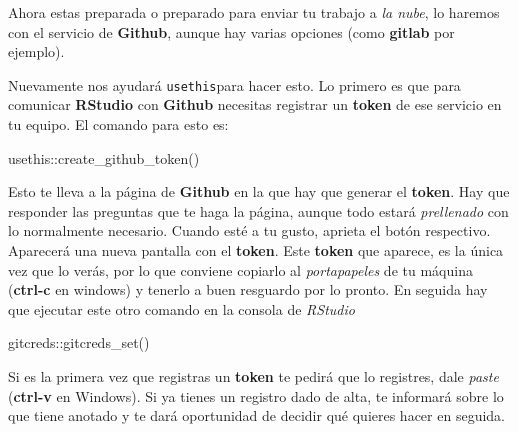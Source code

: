 \documentclass[
  spanish,
  letterpaper,
  DIV=11,
  numbers=noendperiod]{scrartcl}
\newenvironment{Shaded}{\begin{snugshade}}{\end{snugshade}}
\newcommand{\FunctionTok}[1]{\textcolor[rgb]{0.28,0.35,0.67}{#1}}
\newcommand{\NormalTok}[1]{\textcolor[rgb]{0.00,0.23,0.31}{#1}}
\newcommand{\SpecialCharTok}[1]{\textcolor[rgb]{0.37,0.37,0.37}{#1}}
\begin{document}
\begin{tcolorbox}
\end{tcolorbox}

\begin{tcolorbox}[enhanced jigsaw, rightrule=.15mm, toprule=.15mm, coltitle=black, opacitybacktitle=0.6, colframe=quarto-callout-warning-color-frame, leftrule=.75mm, title=\textcolor{quarto-callout-warning-color}{\faExclamationTriangle}\hspace{0.5em}{Enviar el \emph{repositorio} \textbf{git} a la nube}, bottomtitle=1mm, toptitle=1mm, colbacktitle=quarto-callout-warning-color!10!white, colback=white, breakable, opacityback=0, left=2mm, arc=.35mm, bottomrule=.15mm, titlerule=0mm]

Ahora estas preparada o preparado para enviar tu trabajo a \emph{la
nube}, lo haremos con el servicio de \textbf{Github}, aunque hay varias
opciones (como \textbf{gitlab} por ejemplo).

Nuevamente nos ayudará \texttt{usethis}para hacer esto. Lo primero es
que para comunicar \textbf{RStudio} con \textbf{Github} necesitas
registrar un \textbf{token} de ese servicio en tu equipo. El comando
para esto es:

\begin{Shaded}
\begin{Highlighting}[]
\NormalTok{usethis}\SpecialCharTok{::}\FunctionTok{create\_github\_token}\NormalTok{()}
\end{Highlighting}
\end{Shaded}

Esto te lleva a la página de \textbf{Github} en la que hay que generar
el \textbf{token}. Hay que responder las preguntas que te haga la
página, aunque todo estará \emph{prellenado} con lo normalmente
necesario. Cuando esté a tu gusto, aprieta el botón respectivo.
Aparecerá una nueva pantalla con el \textbf{token}. Este \textbf{token}
que aparece, es la única vez que lo verás, por lo que conviene copiarlo
al \emph{portapapeles} de tu máquina (\textbf{ctrl-c} en windows) y
tenerlo a buen resguardo por lo pronto. En seguida hay que ejecutar este
otro comando en la consola de \emph{RStudio}

\begin{Shaded}
\begin{Highlighting}[]
\NormalTok{gitcreds}\SpecialCharTok{::}\FunctionTok{gitcreds\_set}\NormalTok{()}
\end{Highlighting}
\end{Shaded}

Si es la primera vez que registras un \textbf{token} te pedirá que lo
registres, dale \emph{paste} (\textbf{ctrl-v} en Windows). Si ya tienes
un registro dado de alta, te informará sobre lo que tiene anotado y te
dará oportunidad de decidir qué quieres hacer en seguida.


\end{tcolorbox}
\end{document}
